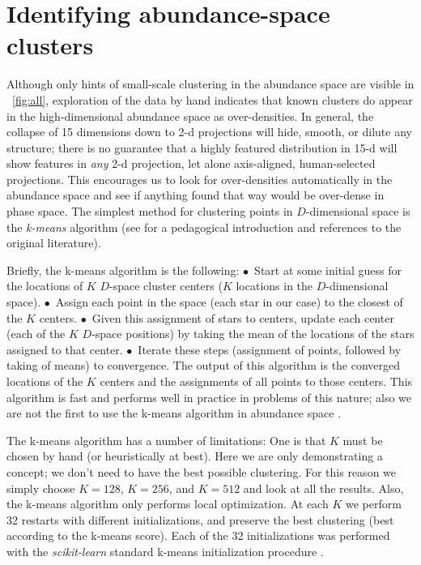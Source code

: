 \documentclass[12pt, letterpaper, preprint]{aastex}
\newcommand{\project}[1]{\textsl{#1}}
\begin{document}
\clearpage
\section{Identifying abundance-space clusters}\label{sec:method}

Although only hints of small-scale clustering in the abundance space
are visible in \figurename~\ref{fig:all}, exploration of the data by hand indicates that
known clusters do appear in the high-dimensional abundance space as over-densities.
In general, the collapse of 15 dimensions down to 2-d projections
will hide, smooth, or dilute any structure; there is no guarantee that
a highly featured distribution in 15-d will show features in
\emph{any} 2-d projection, let alone axis-aligned, human-selected projections.
This encourages us to look for over-densities automatically in the
abundance space and see if anything found that way would be over-dense
in phase space.
The simplest method for clustering points in $D$-dimensional space is
the \emph{k-means} algorithm (see \citealt{bishop} for a pedagogical
introduction and references to the original literature).

Briefly, the k-means algorithm is the following:
$\bullet$~Start at some initial guess for the locations of $K$ $D$-space cluster centers ($K$
locations in the $D$-dimensional space).
$\bullet$~Assign each point in the
space (each star in our case) to the closest of the $K$ centers.
$\bullet$~Given this assignment of stars to centers, update each center (each of
the $K$ $D$-space positions) by taking the mean of the locations of
the stars assigned to that center.
$\bullet$~Iterate these steps (assignment of points, followed by taking of means) to convergence.
The output of this algorithm is the converged locations of the $K$ centers and the assignments of
all points to those centers.
This algorithm is fast and performs well in practice in problems of
this nature; also we are not the first to use the k-means algorithm in
abundance space \citep{gratton}.

The k-means algorithm has a number of limitations:
One is that $K$ must be chosen by hand (or heuristically at best).
Here we are only demonstrating a concept; we don't need to have the
best possible clustering.
For this reason we simply choose $K=128$, $K=256$, and $K=512$ and look at all the
results.
Also, the k-means algorithm only performs local optimization.
At each $K$ we perform 32 restarts with different initializations, and
preserve the best clustering (best according to the k-means score).
Each of the 32 initializations was performed with the
\project{scikit-learn} standard k-means initialization procedure
\citep{sklearn}.
\end{document}
